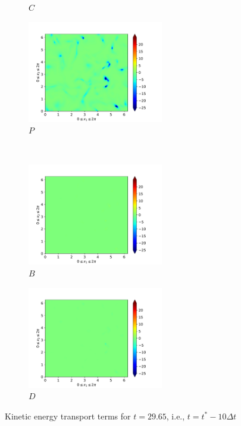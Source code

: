 \begin{figure}[H]
\begin{subfigure}{0.45\textwidth}
        \caption{$C$}
    \end{subfigure}
    \newline
    \begin{subfigure}{0.45\textwidth}
        \includegraphics[height=1.75in]{media/run-cds-65/P-ke-1330}
        \caption{$P$}
    \end{subfigure}
    ~
    \begin{subfigure}{0.45\textwidth}
        \includegraphics[height=1.75in]{media/run-cds-65/B-ke-1330}
        \caption{$B$}
    \end{subfigure}
    \newline
    \begin{subfigure}{0.45\textwidth}
        \includegraphics[height=1.75in]{media/run-cds-65/D-ke-1330}
        \caption{$D$}
    \end{subfigure}
    \caption{Kinetic energy transport terms for $t=29.65$, i.e., $t=t^{\ast} - 10 \Delta t$}
\end{figure}

\newpage

